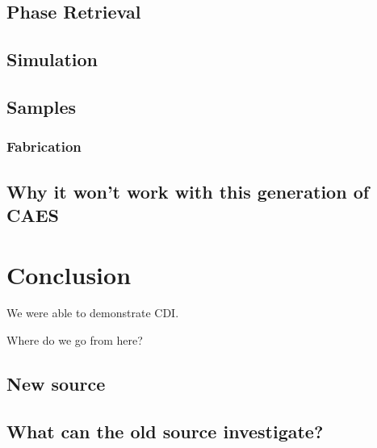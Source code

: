 \section{Phase Retrieval}

\section{Simulation}

\section{Samples}

\subsection{Fabrication}

\section{Why it won't work with this generation of CAES}



\chapter{Conclusion}

We were able to demonstrate CDI.

Where do we go from here?

\section{New source}

\section{What can the old source investigate?}


